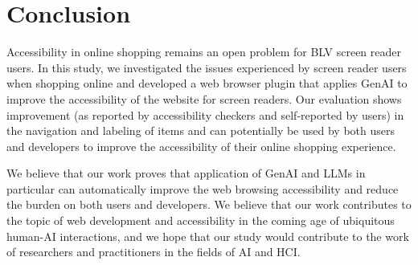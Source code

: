 \section{Conclusion}

Accessibility in online shopping remains an open problem for BLV screen reader users. In this study, we investigated the issues experienced by screen reader users when shopping online and developed a web browser plugin that applies GenAI to improve the accessibility of the website for screen readers. Our evaluation shows improvement (as reported by accessibility checkers and self-reported by users) in the navigation and labeling of items and can potentially be used by both users and developers to improve the accessibility of their online shopping experience. 

We believe that our work proves that application of GenAI and LLMs in particular can automatically improve the web browsing accessibility and reduce the burden on both users and developers. We believe that our work contributes to the topic of web development and accessibility in the coming age of ubiquitous human-AI interactions, and we hope that our study would contribute to the work of researchers and practitioners in the fields of AI and HCI. 

